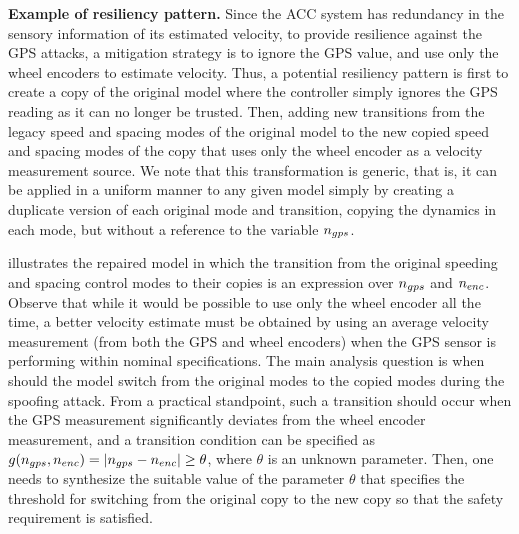 \vspace{0.5em}
\noindent
{\bf Example of resiliency pattern.}
Since the ACC system has redundancy in the sensory information of its estimated velocity, to provide resilience against the GPS attacks, a mitigation strategy is to ignore the GPS value, and use only the wheel encoders to estimate velocity. 
%
Thus, a potential resiliency pattern is first to create a copy of the original model where the controller simply ignores the GPS reading as it can no longer be trusted. 
%
Then, adding new transitions from the legacy speed and spacing modes of the original model to the new copied speed and spacing modes of the copy that uses only the wheel encoder as a velocity measurement source. We note that this transformation is generic, that is, it can be applied in a uniform manner to any given model simply by creating a duplicate version of each original mode and transition, copying the dynamics in each mode, but without a reference to the variable $n_{gps}$. 

 illustrates the repaired model in which the transition from the original speeding and spacing control modes to their copies is an expression over $n_{gps}$ and $n_{enc}$. 
%
Observe that while it would be possible to use only the wheel encoder all the time, a better velocity estimate must be obtained by using an average velocity measurement (from both the GPS and wheel encoders) when the GPS sensor is performing within nominal specifications. The main analysis question is when should the model switch from the original modes to the copied modes during the spoofing attack. %
%
From a practical standpoint, such a transition should occur when the GPS measurement significantly deviates from the wheel encoder measurement, and a transition condition can be specified as $g(n_{gps},n_{enc}) = |n_{gps} -n_{enc}| \geq \theta$, where $\theta$ is an unknown parameter. Then, one needs to synthesize the suitable value of the parameter $\theta$ that specifies the threshold for switching from the original copy to the new copy so that the safety requirement is satisfied.



